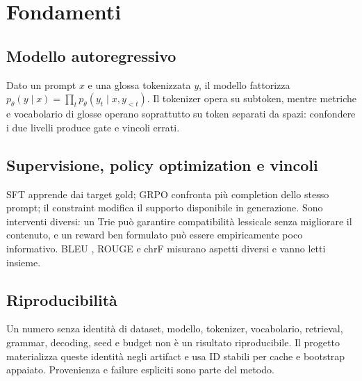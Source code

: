 \chapter{Fondamenti}\label{chap:background}
\section{Modello autoregressivo}
Dato un prompt $x$ e una glossa tokenizzata $y$, il modello fattorizza
$p_\theta(y\mid x)=\prod_t p_\theta(y_t\mid x,y_{<t})$. Il tokenizer opera su
subtoken, mentre metriche e vocabolario di glosse operano soprattutto su token
separati da spazi: confondere i due livelli produce gate e vincoli errati.

\section{Supervisione, policy optimization e vincoli}
SFT apprende dai target gold; GRPO confronta più completion dello stesso prompt;
il constraint modifica il supporto disponibile in generazione. Sono interventi
diversi: un Trie può garantire compatibilità lessicale senza migliorare il
contenuto, e un reward ben formulato può essere empiricamente poco informativo.
BLEU \cite{papineni2002bleu}, ROUGE \cite{lin2004rouge} e chrF misurano aspetti
diversi e vanno letti insieme.

\section{Riproducibilità}
Un numero senza identità di dataset, modello, tokenizer, vocabolario, retrieval,
grammar, decoding, seed e budget non è un risultato riproducibile. Il progetto
materializza queste identità negli artifact e usa ID stabili per cache e
bootstrap appaiato. Provenienza e failure espliciti sono parte del metodo.
